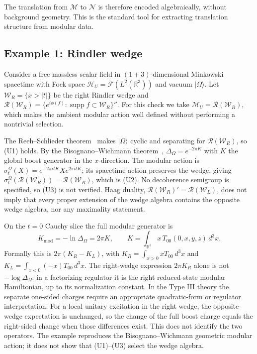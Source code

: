 \documentclass[12pt,a4paper]{article}
\begin{document}
The translation from $\mathcal M$ to $\mathcal N$ is therefore encoded algebraically, without background geometry. This is the standard tool for extracting translation structure from modular data.


\subsection{Example 1: Rindler wedge}
\label{sec:rindler}

Consider a free massless scalar field in $(1+3)$-dimensional Minkowski spacetime with Fock space $\mathcal{H}_U = \mathcal{F}(L^2(\mathbb{R}^3))$ and vacuum $|\Omega\rangle$. Let $\mathcal{W}_R = \{x > |t|\}$ be the right Rindler wedge and $\mathcal{R}(\mathcal{W}_R) = \{e^{i\phi(f)} : \operatorname{supp} f \subset \mathcal{W}_R\}''$. For this check we take $\mathcal M_U=\mathcal R(\mathcal W_R)$, which makes the ambient modular action well defined without performing a nontrivial selection.

The Reeh--Schlieder theorem~\cite{Haag1996} makes $|\Omega\rangle$ cyclic and separating for $\mathcal{R}(\mathcal{W}_R)$, so (U1) holds. By the Bisognano--Wichmann theorem~\cite{BisognanoWichmann1975, BisognanoWichmann1976}, $\Delta_\Omega = e^{-2\pi K}$ with $K$ the global boost generator in the $x$-direction. The modular action is $\sigma_t^\Omega(X)=e^{-2\pi itK}Xe^{2\pi itK}$; its spacetime action preserves the wedge, giving $\sigma_t^\Omega(\mathcal{R}(\mathcal{W}_R)) = \mathcal{R}(\mathcal{W}_R)$, which is (U2). No decoherence semigroup is specified, so (U3) is not verified. Haag duality, $\mathcal R(\mathcal W_R)'=\mathcal R(\mathcal W_L)$, does not imply that every proper extension of the wedge algebra contains the opposite wedge algebra, nor any maximality statement.

On the $t=0$ Cauchy slice the full modular generator is
\begin{equation}
K_{\mathrm{mod}} = -\ln \Delta_\Omega = 2\pi K,
\qquad K=\int_{\mathbb R^3}x\,T_{00}(0,x,y,z)\,d^3x .
\end{equation}
Formally this is $2\pi(K_R-K_L)$, with $K_R=\int_{x>0}xT_{00}\,d^3x$ and $K_L=\int_{x<0}(-x)T_{00}\,d^3x$. The right-wedge expression $2\pi K_R$ alone is not $-\log\Delta_\Omega$: in a factorizing regulator it is the right reduced-state modular Hamiltonian, up to its normalization constant. In the Type III theory the separate one-sided charges require an appropriate quadratic-form or regulator interpretation. For a local unitary excitation in the right wedge, the opposite-wedge expectation is unchanged, so the change of the full boost charge equals the right-sided change when those differences exist. This does not identify the two operators. The example reproduces the Bisognano--Wichmann geometric modular action; it does not show that (U1)--(U3) select the wedge algebra.
\end{document}
